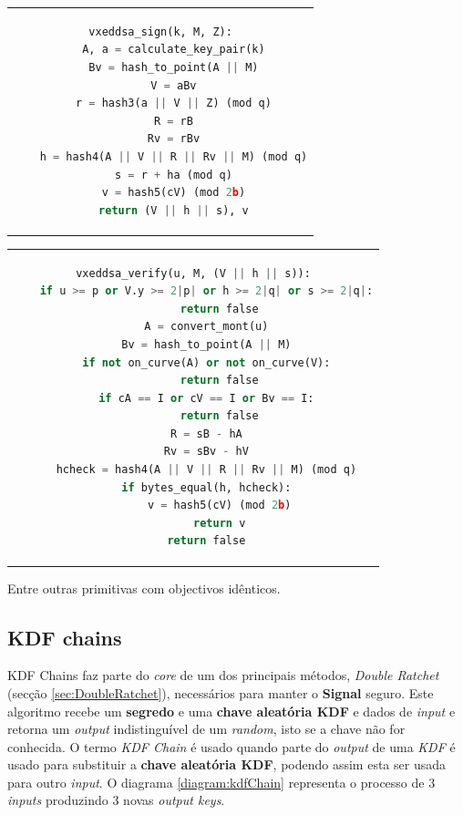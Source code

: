 \begin{center}
\begin{tabular}{c}
\begin{lstlisting}[language=Python,caption=Assinatura de um documento,captionpos=b]
vxeddsa_sign(k, M, Z):
    A, a = calculate_key_pair(k)
    Bv = hash_to_point(A || M)
    V = aBv
    r = hash3(a || V || Z) (mod q)
    R = rB
    Rv = rBv
    h = hash4(A || V || R || Rv || M) (mod q)
    s = r + ha (mod q)
    v = hash5(cV) (mod 2b)
    return (V || h || s), v
\end{lstlisting}
\end{tabular}
\end{center}


\begin{center}
\begin{tabular}{c}
\begin{lstlisting}[language=Python,caption=Validação de assinatura de um documento,captionpos=b]
vxeddsa_verify(u, M, (V || h || s)):
    if u >= p or V.y >= 2|p| or h >= 2|q| or s >= 2|q|:
        return false
    A = convert_mont(u)
    Bv = hash_to_point(A || M)
    if not on_curve(A) or not on_curve(V):
        return false
    if cA == I or cV == I or Bv == I:
        return false
    R = sB - hA
    Rv = sBv - hV
    hcheck = hash4(A || V || R || Rv || M) (mod q)
    if bytes_equal(h, hcheck):
        v = hash5(cV) (mod 2b)
        return v
    return false
\end{lstlisting}
\end{tabular}
\end{center}

Entre outras primitivas com objectivos idênticos.

\subsection{KDF chains}\label{sec:KDF}
KDF Chains faz parte do \emph{core} de um dos principais métodos, \emph{Double Ratchet} (secção \ref{sec:DoubleRatchet}), necessários para manter o \textbf{Signal} seguro.
Este algoritmo recebe um \textbf{segredo} e uma \textbf{chave aleatória KDF} e dados de \emph{input} e retorna um \emph{output} indistinguível de um \emph{random}, isto se a chave não for conhecida.
O termo \emph{KDF Chain} é usado quando parte do \emph{output} de uma \emph{KDF} é usado para substituir a \textbf{chave aleatória KDF}, podendo assim esta ser usada para outro \emph{input}. O diagrama \ref{diagram:kdfChain} representa o processo de 3 \emph{inputs} produzindo 3 novas \emph{output keys}.


